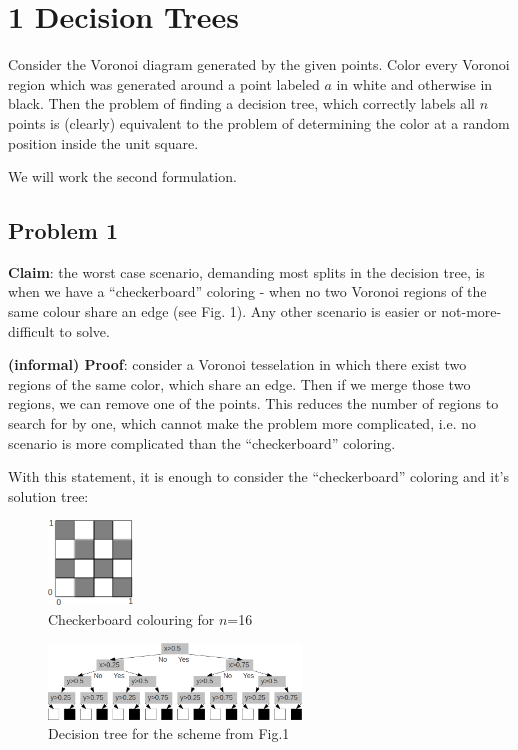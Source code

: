 \section*{1 Decision Trees}

Consider the Voronoi diagram generated by the given points. Color every Voronoi region which was generated around a point labeled $a$ in white and otherwise in black. Then the problem of finding a decision tree, which correctly labels all $n$ points is (clearly) equivalent to the problem of determining the color at a random position inside the unit square.

We will work the second formulation.

\subsection*{Problem 1}

\textbf{Claim}: the worst case scenario, demanding most splits in the decision tree, is when we have a ``checkerboard'' coloring - when no two Voronoi regions of the same colour share an edge (see Fig. 1). Any other scenario is easier or not-more-difficult to solve.

\textbf{(informal) Proof}: consider a Voronoi tesselation in which there exist two regions of the same color, which share an edge. Then if we merge those two regions, we can remove one of the points. This reduces the number of regions to search for by one, which cannot make the problem more complicated, i.e. no scenario is more complicated than the ``checkerboard'' coloring.

With this statement, it is enough to consider the ``checkerboard'' coloring and it's solution tree:

\begin{figure}[!h]
  \begin{center}
    \includegraphics[width=0.2\textwidth]{plots/1_1.png}
    \caption{Checkerboard colouring for $n$=16}
  \end{center}
\end{figure}


\begin{figure}[!ht]
  \begin{center}
    \includegraphics[width=0.60\textwidth]{plots/1_2.png}
    \caption{Decision tree for the scheme from Fig.1}
  \end{center}
\end{figure}


